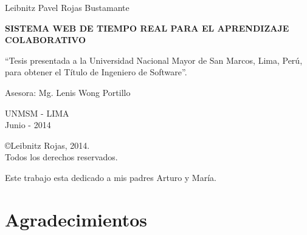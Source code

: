 \newpage
\begin{center}
    Leibnitz Pavel Rojas Bustamante
\end{center}
\vspace*{3cm}
\begin{Large}
\textbf{SISTEMA WEB DE TIEMPO REAL PARA EL APRENDIZAJE COLABORATIVO} \\
\end{Large}
\vspace*{5cm}
\begin{flushright}
    \begin{minipage}{.5\textwidth}
    ``Tesis presentada a la Universidad Nacional Mayor de San Marcos, Lima, Perú, para obtener el Título de Ingeniero de Software''.
    \end{minipage}
    \end{flushright}
\vspace*{3cm}
\begin{flushright}
    \begin{minipage}{.5\textwidth}
    Asesora: Mg. Lenis Wong Portillo
    \end{minipage}
\end{flushright}
\vspace*{3cm}
\begin{center}
    UNMSM - LIMA\\
    Junio - 2014
\end{center}

\newpage
\vspace*{\fill}
\begin{center}
\copyright \hspace{0.2cm}Leibnitz Rojas, 2014.\\
Todos los derechos reservados.
\end{center}

\newpage
\clearpage
\vspace*{\fill}
\begin{flushright}
\begin{minipage}{.5\textwidth}
Este trabajo esta dedicado a mis padres Arturo y María.\\
\end{minipage}
\end{flushright}
\vfill %
\newpage
\chapter*{Agradecimientos}

